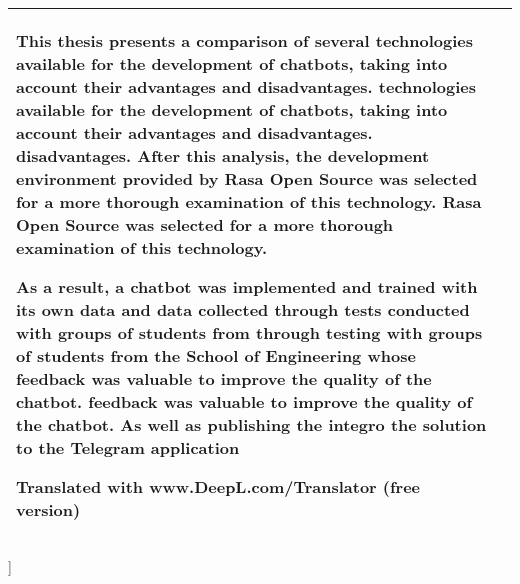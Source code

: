 \begin{@twocolumnfalse}
\begin{tabular}{p{6cm} p{10.3cm}}
			This thesis presents a comparison of several technologies available for the
			development of chatbots, taking into account their advantages and disadvantages.
			technologies available for the development of chatbots, taking into account
			their advantages and disadvantages.
			disadvantages. After this analysis, the development environment provided by
			Rasa Open Source was selected for a more thorough examination of this technology.
			Rasa Open Source was selected for a more thorough examination of this
			technology.

			As a result, a chatbot was implemented and trained with its own data and data collected
			through tests conducted with groups of students from
			through testing with groups of students from the School of Engineering
			whose feedback was valuable to improve the quality of the chatbot.
			feedback was valuable to improve the quality of the chatbot. As well as
			publishing the integro
			the solution to the Telegram application

			Translated with www.DeepL.com/Translator (free version)
			\\ \hline

		\end{tabular}

	\end{@twocolumnfalse}
]
